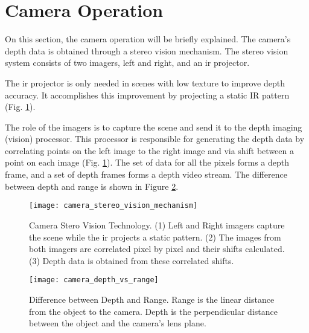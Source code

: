 

\section{Camera Operation}
\label{sec:vision_system_camera_operation}

On this section, the camera operation will be briefly explained. The camera's depth data is obtained through a stereo vision mechanism. The stereo vision system consists of two imagers, left and right, and an \gls{ir} projector. 

The \gls{ir} projector is only needed in scenes with low texture to improve depth accuracy. It accomplishes this improvement by projecting a static IR pattern (Fig. \ref{fig:camera_stereo_vision_mechanism}).

The role of the imagers is to capture the scene and send it to the depth imaging (vision) processor. This processor is responsible for generating the depth data by correlating points on the left image to the right image and via shift between a point on each image (Fig. \ref{fig:camera_stereo_vision_mechanism}). The set of data for all the pixels forms a depth frame, and a set of depth frames forms a depth video stream. The difference between depth and range is shown in Figure \ref{fig:camera_depth_vs_range}.

\begin{figure}[htbp]
	\centering
	\texttt{[image: camera\_stereo\_vision\_mechanism]}
	\caption[Camera Stero Vision Technology.]{Camera Stero Vision Technology. (1) Left and Right imagers capture the scene while the \gls{ir} projects a static pattern. (2) The images from both imagers are correlated pixel by pixel and their shifts calculated. (3) Depth data is obtained from these correlated shifts.}  
	\label{fig:camera_stereo_vision_mechanism}
\end{figure}

\begin{figure}[htbp]
	\centering
	\texttt{[image: camera\_depth\_vs\_range]}
	\caption[Difference between Depth and Range.]{Difference between Depth and Range. Range is the linear distance from the object to the camera. Depth is the perpendicular distance between the object and the camera's lens plane.}
	\label{fig:camera_depth_vs_range}
\end{figure}

